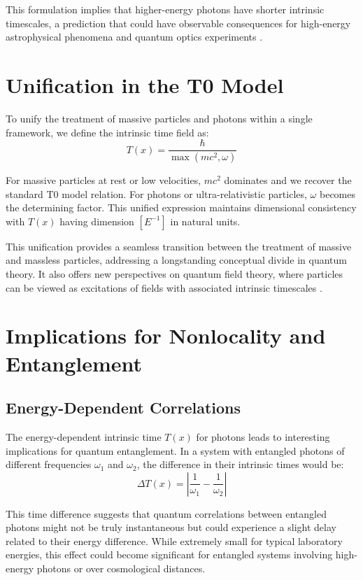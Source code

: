 \documentclass[12pt,a4paper]{article}
\newcommand{\Tfield}{T(x)}
\begin{document}
	This formulation implies that higher-energy photons have shorter intrinsic timescales, a prediction that could have observable consequences for high-energy astrophysical phenomena and quantum optics experiments \cite{pascher_emergente_gravitation_2025}.
	
	\section{Unification in the T0 Model}
	To unify the treatment of massive particles and photons within a single framework, we define the intrinsic time field as:
	\begin{equation}
		\Tfield = \frac{\hbar}{\max(m c^2, \omega)}
	\end{equation}
	
	For massive particles at rest or low velocities, \(m c^2\) dominates and we recover the standard T0 model relation. For photons or ultra-relativistic particles, \(\omega\) becomes the determining factor. This unified expression maintains dimensional consistency with \(\Tfield\) having dimension \([E^{-1}]\) in natural units.
	
	This unification provides a seamless transition between the treatment of massive and massless particles, addressing a longstanding conceptual divide in quantum theory. It also offers new perspectives on quantum field theory, where particles can be viewed as excitations of fields with associated intrinsic timescales \cite{pascher_feldtheorie_2025}.
	
	\section{Implications for Nonlocality and Entanglement}
	\subsection{Energy-Dependent Correlations}
	The energy-dependent intrinsic time \(\Tfield\) for photons leads to interesting implications for quantum entanglement. In a system with entangled photons of different frequencies \(\omega_1\) and \(\omega_2\), the difference in their intrinsic times would be:
	\begin{equation}
		\Delta \Tfield = \left|\frac{1}{\omega_1} - \frac{1}{\omega_2}\right|
	\end{equation}
	
	This time difference suggests that quantum correlations between entangled photons might not be truly instantaneous but could experience a slight delay related to their energy difference. While extremely small for typical laboratory energies, this effect could become significant for entangled systems involving high-energy photons or over cosmological distances.
	
\end{document}
